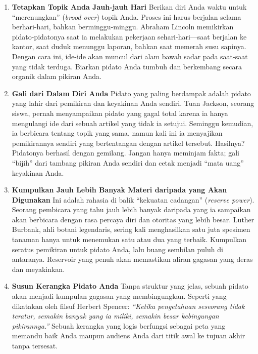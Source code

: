 \documentclass[
  letterpaper,
  DIV=11,
  numbers=noendperiod]{scrreprt}
\begin{document}
\begin{enumerate}
\def\labelenumi{\arabic{enumi}.}
\item
  \textbf{Tetapkan Topik Anda Jauh-jauh Hari} Berikan diri Anda waktu
  untuk ``merenungkan'' (\emph{brood over}) topik Anda. Proses ini harus
  berjalan selama berhari-hari, bahkan berminggu-minggu. Abraham Lincoln
  memikirkan pidato-pidatonya saat ia melakukan pekerjaan
  sehari-hari---saat berjalan ke kantor, saat duduk menunggu laporan,
  bahkan saat memerah susu sapinya. Dengan cara ini, ide-ide akan muncul
  dari alam bawah sadar pada saat-saat yang tidak terduga. Biarkan
  pidato Anda tumbuh dan berkembang secara organik dalam pikiran Anda.
\item
  \textbf{Gali dari Dalam Diri Anda} Pidato yang paling berdampak adalah
  pidato yang lahir dari pemikiran dan keyakinan Anda sendiri. Tuan
  Jackson, seorang siswa, pernah menyampaikan pidato yang gagal total
  karena ia hanya mengulangi ide dari sebuah artikel yang tidak ia
  setujui. Seminggu kemudian, ia berbicara tentang topik yang sama,
  namun kali ini ia menyajikan pemikirannya sendiri yang bertentangan
  dengan artikel tersebut. Hasilnya? Pidatonya berhasil dengan gemilang.
  Jangan hanya meminjam fakta; gali ``bijih'' dari tambang pikiran Anda
  sendiri dan cetak menjadi ``mata uang'' keyakinan Anda.
\item
  \textbf{Kumpulkan Jauh Lebih Banyak Materi daripada yang Akan
  Digunakan} Ini adalah rahasia di balik ``kekuatan cadangan''
  (\emph{reserve power}). Seorang pembicara yang tahu jauh lebih banyak
  daripada yang ia sampaikan akan berbicara dengan rasa percaya diri dan
  otoritas yang lebih besar. Luther Burbank, ahli botani legendaris,
  sering kali menghasilkan satu juta spesimen tanaman hanya untuk
  menemukan satu atau dua yang terbaik. Kumpulkan seratus pemikiran
  untuk pidato Anda, lalu buang sembilan puluh di antaranya. Reservoir
  yang penuh akan memastikan aliran gagasan yang deras dan meyakinkan.
\item
  \textbf{Susun Kerangka Pidato Anda} Tanpa struktur yang jelas, sebuah
  pidato akan menjadi kumpulan gagasan yang membingungkan. Seperti yang
  dikatakan oleh filsuf Herbert Spencer: \emph{``Ketika pengetahuan
  seseorang tidak teratur, semakin banyak yang ia miliki, semakin besar
  kebingungan pikirannya.''} Sebuah kerangka yang logis berfungsi
  sebagai peta yang memandu baik Anda maupun audiens Anda dari titik
  awal ke tujuan akhir tanpa tersesat.
\end{enumerate}
\end{document}
